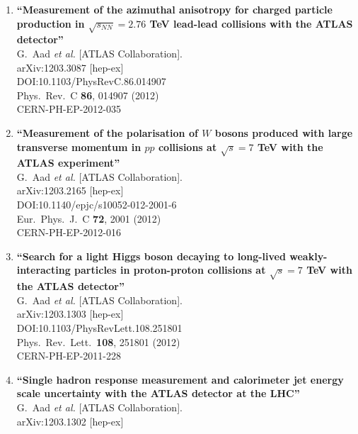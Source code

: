 \documentclass{article}
\begin{document}
\begin{enumerate}
\item%
{\bf ``Measurement of the azimuthal anisotropy for charged particle production in $\sqrt{s_{NN}}=2.76$ TeV lead-lead collisions with the ATLAS detector''}
  \\{}G.~Aad {\it et al.} [ATLAS Collaboration].
  \\{}arXiv:1203.3087 [hep-ex]
  \\{}DOI:10.1103/PhysRevC.86.014907
  \\{}Phys.\ Rev.\ C {\bf 86}, 014907 (2012)
  \\{}CERN-PH-EP-2012-035
\item%
{\bf ``Measurement of the polarisation of $W$ bosons produced with large transverse momentum in $pp$ collisions at $\sqrt{s}=7$ TeV with the ATLAS experiment''}
  \\{}G.~Aad {\it et al.} [ATLAS Collaboration].
  \\{}arXiv:1203.2165 [hep-ex]
  \\{}DOI:10.1140/epjc/s10052-012-2001-6
  \\{}Eur.\ Phys.\ J.\ C {\bf 72}, 2001 (2012)
  \\{}CERN-PH-EP-2012-016
\item%
{\bf ``Search for a light Higgs boson decaying to long-lived weakly-interacting particles in proton-proton collisions at $\sqrt{s}=7$ TeV with the ATLAS detector''}
  \\{}G.~Aad {\it et al.} [ATLAS Collaboration].
  \\{}arXiv:1203.1303 [hep-ex]
  \\{}DOI:10.1103/PhysRevLett.108.251801
  \\{}Phys.\ Rev.\ Lett.\  {\bf 108}, 251801 (2012)
  \\{}CERN-PH-EP-2011-228
\item%
{\bf ``Single hadron response measurement and calorimeter jet energy scale uncertainty with the ATLAS detector at the LHC''}
  \\{}G.~Aad {\it et al.} [ATLAS Collaboration].
  \\{}arXiv:1203.1302 [hep-ex]

\end{enumerate}
\end{document}
